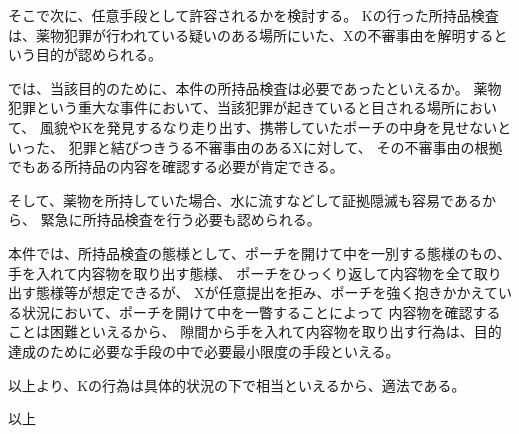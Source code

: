 \documentclass[11pt]{jsarticle}
\begin{document}
			そこで次に、任意手段として許容されるかを検討する。
			Kの行った所持品検査は、薬物犯罪が行われている疑いのある場所にいた、Xの不審事由を解明するという目的が認められる。
			
			では、当該目的のために、本件の所持品検査は必要であったといえるか。
			薬物犯罪という重大な事件において、当該犯罪が起きていると目される場所において、
			風貌やKを発見するなり走り出す、携帯していたポーチの中身を見せないといった、
			犯罪と結びつきうる不審事由のあるXに対して、
			その不審事由の根拠でもある所持品の内容を確認する必要が肯定できる。
			
			そして、薬物を所持していた場合、水に流すなどして証拠隠滅も容易であるから、
			緊急に所持品検査を行う必要も認められる。
			
			本件では、所持品検査の態様として、ポーチを開けて中を一別する態様のもの、手を入れて内容物を取り出す態様、
			ポーチをひっくり返して内容物を全て取り出す態様等が想定できるが、
			Xが任意提出を拒み、ポーチを強く抱きかかえている状況において、ポーチを開けて中を一瞥することによって
			内容物を確認することは困難といえるから、
			隙間から手を入れて内容物を取り出す行為は、目的達成のために必要な手段の中で必要最小限度の手段といえる。
			
	\sectionB{}
		以上より、Kの行為は具体的状況の下で相当といえるから、適法である。




\begin{flushright}
	以上
\end{flushright}
	
\end{document}
